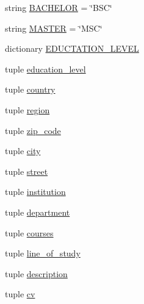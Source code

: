 \begin{DoxyCompactItemize}
\item 
string \hyperlink{classstudents_1_1models_1_1_student_a44c22f24f6430caa8c30a11cc2eda2f9}{B\-A\-C\-H\-E\-L\-O\-R} = \char`\"{}B\-S\-C\char`\"{}
\item 
string \hyperlink{classstudents_1_1models_1_1_student_a96eaf2a1b27d151cc511133ded581dc4}{M\-A\-S\-T\-E\-R} = \char`\"{}M\-S\-C\char`\"{}
\item 
dictionary \hyperlink{classstudents_1_1models_1_1_student_a8f86f0fb0935aa98bf4e4c662c144943}{E\-D\-U\-C\-T\-A\-T\-I\-O\-N\-\_\-\-L\-E\-V\-E\-L}
\item 
tuple \hyperlink{classstudents_1_1models_1_1_student_a43909b3b49d600bfb53f10286a838fe0}{education\-\_\-level}
\item 
tuple \hyperlink{classstudents_1_1models_1_1_student_a03e45fddb9a4c1cd701ecf71ce750b55}{country}
\item 
tuple \hyperlink{classstudents_1_1models_1_1_student_a4c97e38c90574a31ad7a4604ee731128}{region}
\item 
tuple \hyperlink{classstudents_1_1models_1_1_student_a276c47ab433d4e1f7e4aff01036bd9cf}{zip\-\_\-code}
\item 
tuple \hyperlink{classstudents_1_1models_1_1_student_ac237b28a8bc0d6f538fcfcb64f1bbede}{city}
\item 
tuple \hyperlink{classstudents_1_1models_1_1_student_a389b723936a0a1ca5f8327563c1a7187}{street}
\item 
tuple \hyperlink{classstudents_1_1models_1_1_student_a41718377a531d1677d8196ac292ccb43}{institution}
\item 
tuple \hyperlink{classstudents_1_1models_1_1_student_ab9b3060609019e2bc54a43d2e09c0cbd}{department}
\item 
tuple \hyperlink{classstudents_1_1models_1_1_student_a08fe0c93f50c6a1699ff506a76ef3172}{courses}
\item 
tuple \hyperlink{classstudents_1_1models_1_1_student_af95758393c5324d289f2b24441222b32}{line\-\_\-of\-\_\-study}
\item 
tuple \hyperlink{classstudents_1_1models_1_1_student_a56967491948903227152a9fa074c9546}{description}
\item 
tuple \hyperlink{classstudents_1_1models_1_1_student_ad1da7d6dcdd52dcef337cf689b329e19}{cv}
\end{DoxyCompactItemize}


